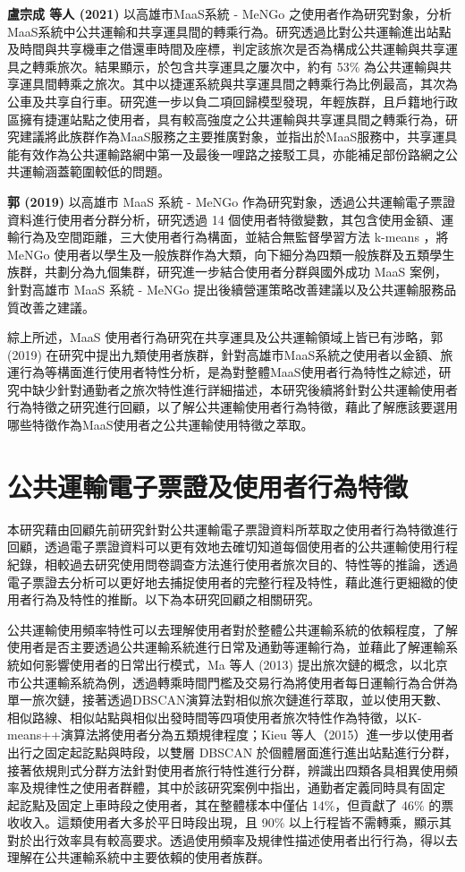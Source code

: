 \textbf{盧宗成 等人 (2021)} 以高雄市MaaS系統 - MeNGo
之使用者作為研究對象，分析MaaS系統中公共運輸和共享運具間的轉乘行為。研究透過比對公共運輸進出站點及時間與共享機車之借還車時間及座標，判定該旅次是否為構成公共運輸與共享運具之轉乘旅次。結果顯示，於包含共享運具之屢次中，約有
53\%
為公共運輸與共享運具間轉乘之旅次。其中以捷運系統與共享運具間之轉乘行為比例最高，其次為公車及共享自行車。研究進一步以負二項回歸模型發現，年輕族群，且戶籍地行政區擁有捷運站點之使用者，具有較高強度之公共運輸與共享運具間之轉乘行為，研究建議將此族群作為MaaS服務之主要推廣對象，並指出於MaaS服務中，共享運具能有效作為公共運輸路網中第一及最後一哩路之接駁工具，亦能補足部份路網之公共運輸涵蓋範圍較低的問題。

\textbf{郭 (2019)} 以高雄市 MaaS 系統 - MeNGo
作為研究對象，透過公共運輸電子票證資料進行使用者分群分析，研究透過 14
個使用者特徵變數，其包含使用金額、運輸行為及空間距離，三大使用者行為構面，並結合無監督學習方法
k-means ，將 MeNGo
使用者以學生及一般族群作為大類，向下細分為四類一般族群及五類學生族群，共劃分為九個集群，研究進一步結合使用者分群與國外成功
MaaS 案例，針對高雄市 MaaS 系統 - MeNGo
提出後續營運策略改善建議以及公共運輸服務品質改善之建議。

綜上所述，MaaS 使用者行為研究在共享運具及公共運輸領域上皆已有涉略，郭
(2019)
在研究中提出九類使用者族群，針對高雄市MaaS系統之使用者以金額、旅運行為等構面進行使用者特性分析，是為對整體MaaS使用者行為特性之綜述，研究中缺少針對通勤者之旅次特性進行詳細描述，本研究後續將針對公共運輸使用者行為特徵之研究進行回顧，以了解公共運輸使用者行為特徵，藉此了解應該要選用哪些特徵作為MaaS使用者之公共運輸使用特徵之萃取。

\section{公共運輸電子票證及使用者行為特徵}\label{ux516cux5171ux904bux8f38ux96fbux5b50ux7968ux8b49ux53caux4f7fux7528ux8005ux884cux70baux7279ux5fb5}

本研究藉由回顧先前研究針對公共運輸電子票證資料所萃取之使用者行為特徵進行回顧，透過電子票證資料可以更有效地去確切知道每個使用者的公共運輸使用行程紀錄，相較過去研究使用問卷調查方法進行使用者旅次目的、特性等的推論，透過電子票證去分析可以更好地去捕捉使用者的完整行程及特性，藉此進行更細緻的使用者行為及特性的推斷。以下為本研究回顧之相關研究。

公共運輸使用頻率特性可以去理解使用者對於整體公共運輸系統的依賴程度，了解使用者是否主要透過公共運輸系統進行日常及通勤等運輸行為，並藉此了解運輸系統如何影響使用者的日常出行模式，Ma
等人 (2013)
提出旅次鏈的概念，以北京市公共運輸系統為例，透過轉乘時間門檻及交易行為將使用者每日運輸行為合併為單一旅次鏈，接著透過DBSCAN演算法對相似旅次鏈進行萃取，並以使用天數、相似路線、相似站點與相似出發時間等四項使用者旅次特性作為特徵，以K-means++演算法將使用者分為五類規律程度；Kieu
等人（2015）進一步以使用者出行之固定起訖點與時段，以雙層 DBSCAN
於個體層面進行進出站點進行分群，接著依規則式分群方法針對使用者旅行特性進行分群，辨識出四類各具相異使用頻率及規律性之使用者群體，其中於該研究案例中指出，通勤者定義同時具有固定
起訖點及固定上車時段之使用者，其在整體樣本中僅佔 14\%，但貢獻了 46\%
的票收收入。這類使用者大多於平日時段出現，且 90\%
以上行程皆不需轉乘，顯示其對於出行效率具有較高要求。透過使用頻率及規律性描述使用者出行行為，得以去理解在公共運輸系統中主要依賴的使用者族群。

